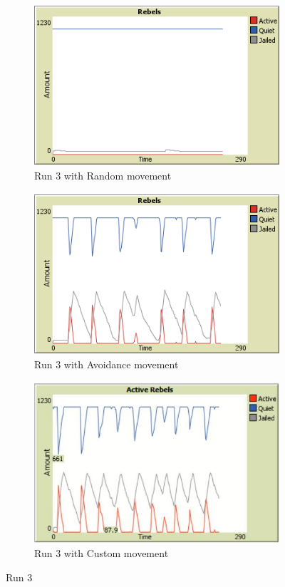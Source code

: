 \documentclass[a4paper,11pt]{article}
\begin{document}
\begin{figure}[h]
 \begin{subfigure}{0.33\textwidth}
  \includegraphics[width=\linewidth, height=6cm]{plotRun3Random.png} 
  \caption{Run 3 with Random movement}
  \label{fig:subimrun3Rand}
 \end{subfigure}
 \begin{subfigure}{0.33\textwidth}
  \includegraphics[width=\linewidth, height=6cm]{plotRun3Avoidance.png}
  \caption{Run 3 with Avoidance movement}
  \label{fig:subimrun3Avoid}
 \end{subfigure}
 \begin{subfigure}{0.33\textwidth}
  \includegraphics[width=\linewidth, height=6cm]{Run3_Custom.JPG}
  \caption{Run 3 with Custom movement}
  \label{fig:subimrun3Custom}
 \end{subfigure}
\caption{Run 3}
\label{fig:figRun3}
\end{figure}
\end{document}
